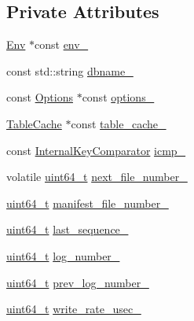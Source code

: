 \subsection*{Private Attributes}
\begin{DoxyCompactItemize}
\item 
\hyperlink{classleveldb_1_1_env}{Env} $\ast$const \hyperlink{classleveldb_1_1_version_set_a4b5d256e88de125738743c80a2a54ade}{env\+\_\+}
\item 
const std\+::string \hyperlink{classleveldb_1_1_version_set_ab52bd63a816220ba031937e291ef2be5}{dbname\+\_\+}
\item 
const \hyperlink{structleveldb_1_1_options}{Options} $\ast$const \hyperlink{classleveldb_1_1_version_set_a820c01d5891293ae45b8efb0f14b1278}{options\+\_\+}
\item 
\hyperlink{classleveldb_1_1_table_cache}{Table\+Cache} $\ast$const \hyperlink{classleveldb_1_1_version_set_afaca99abf7dea9ca06bc9dbb2f0a9ebe}{table\+\_\+cache\+\_\+}
\item 
const \hyperlink{classleveldb_1_1_internal_key_comparator}{Internal\+Key\+Comparator} \hyperlink{classleveldb_1_1_version_set_ad9440f3a41af94731f1e24954630d772}{icmp\+\_\+}
\item 
volatile \hyperlink{stdint_8h_aaa5d1cd013383c889537491c3cfd9aad}{uint64\+\_\+t} \hyperlink{classleveldb_1_1_version_set_a3c1e75e25c11420c0a3189f40e2cba40}{next\+\_\+file\+\_\+number\+\_\+}
\item 
\hyperlink{stdint_8h_aaa5d1cd013383c889537491c3cfd9aad}{uint64\+\_\+t} \hyperlink{classleveldb_1_1_version_set_aaf9c70b0087fadbc2232314cf94b2741}{manifest\+\_\+file\+\_\+number\+\_\+}
\item 
\hyperlink{stdint_8h_aaa5d1cd013383c889537491c3cfd9aad}{uint64\+\_\+t} \hyperlink{classleveldb_1_1_version_set_aafc5d34ff22f4d026860cfc9293a9d41}{last\+\_\+sequence\+\_\+}
\item 
\hyperlink{stdint_8h_aaa5d1cd013383c889537491c3cfd9aad}{uint64\+\_\+t} \hyperlink{classleveldb_1_1_version_set_a0e86a93519bf3e9d61f530dd2f0816a0}{log\+\_\+number\+\_\+}
\item 
\hyperlink{stdint_8h_aaa5d1cd013383c889537491c3cfd9aad}{uint64\+\_\+t} \hyperlink{classleveldb_1_1_version_set_a9ccd7e180391e89ee509825c5f12403d}{prev\+\_\+log\+\_\+number\+\_\+}
\item 
\hyperlink{stdint_8h_aaa5d1cd013383c889537491c3cfd9aad}{uint64\+\_\+t} \hyperlink{classleveldb_1_1_version_set_a251dbfabd4dfa0ad6672a598800437fe}{write\+\_\+rate\+\_\+usec\+\_\+}
\item 

\end{DoxyCompactItemize}
